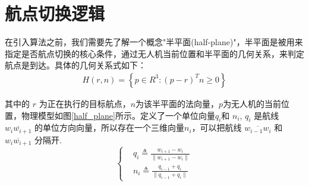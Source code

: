\documentclass[UTF8,a4paper,10pt,nocolorlinks]{ctexart}
\begin{document}
    \section{航点切换逻辑}
    在引入算法之前，我们需要先了解一个概念"半平面(half-plane)"，半平面是被用来指定是否航点切换的核心条件，通过无人机当前位置和半平面的几何关系，来判定航点是到达。具体的几何关系式如下：
    \begin{equation} %
        \begin{aligned}
            \textit{H}(r,n) = \left\{ p \in R^{3} : \left(p-r\right)^{T}n \geq 0 \right\} 
        \end{aligned}
    \end{equation}
    \par 其中的 $r$ 为正在执行的目标航点，$n$为该半平面的法向量，$p$为无人机的当前位置，物理模型如图\ref{half_plane}所示。定义了一个单位向量$q_{i}$和 $n_{i}$,
    $q_{i}$ 是航线 $\overline{w_{i}w_{i+1}}$ 的单位方向向量，所以存在一个三维向量$n_{i}$，可以把航线 $\overline{w_{i-1}w_{i}}$ 和 $\overline{w_{i}w_{i+1}}$ 分隔开.
    \begin{equation}
        \begin{cases}
        &q_{i} \triangleq \frac{w_{i+1}-w_{i}}{\lVert w_{i+1}-w_{i} \rVert} \\
        &n_{i} \triangleq \frac{q_{i-1}+q_{i}}{\lVert q_{i-1}+q_{i} \rVert}
        \end{cases}
    \end{equation}
\end{document}
